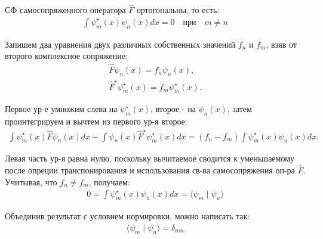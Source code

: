 \documentclass[__main__.tex]{subfiles}
\begin{document}
	
	СФ самосопряженного оператора $\hat F$ ортогональны, то есть:
	\begin{gather*}
	\int \psi^{\star}_m(x) \psi_n(x)dx = 0\quad при\quad m\ne n
	\end{gather*}
	
	Запишем два уравнения двух различных собственных значений $f_n$ и $f_m$, взяв от второго комплексное сопряжение:
	\begin{gather*}
	\hat{F}\psi_n(x)=f_n\psi_n(x),\\
	\hat{F}^\star \psi^\star_m(x)=f_m\psi^\star_m(x).
	\end{gather*}
	
	Первое ур-е умножим слева на $\psi^\star_m(x)$, второе - на $\psi_n(x)$, затем проинтегрируем и вычтем из первого ур-я второе:
	\begin{gather*}
	\int \psi^\star_m(x)\hat{F}\psi_n(x)dx - 
	\int \psi_n(x)\hat{F}^\star \psi^\star_m(x)dx=
	(f_n-f_m)\int \psi^\star_m(x)\psi_n(x)dx.
	\end{gather*}
	
	Левая часть ур-я равна нулю, поскольку вычитаемое сводится к уменьшаемому после опреции транспонирования и использования св-ва самосопряжения оп-ра $\hat{F}$. Учитывая, что $f_n\ne f_m$, получаем:
	\begin{gather*}
	0=\int \psi^\star_m(x)\psi_n(x)dx=
	\langle\psi_m\mid\psi_n\rangle
	\end{gather*}
	
	Объединив результат с условием нормировки, можно написать так:
	\begin{gather*}
	\langle\psi_m\mid\psi_n\rangle=\delta_{mn}
	\end{gather*}
\end{document}
